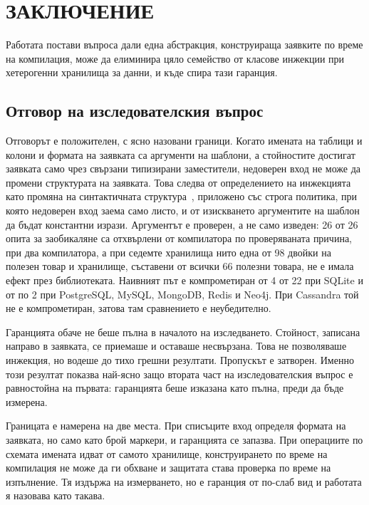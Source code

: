 \section*{ЗАКЛЮЧЕНИЕ}
\label{sec:conclusion}

Работата постави въпроса дали една абстракция, конструираща заявките по време на
компилация, може да елиминира цяло семейство от класове инжекции при хетерогенни
хранилища за данни, и къде спира тази гаранция.

\subsection*{Отговор на изследователския въпрос}

Отговорът е положителен, с ясно назовани граници. Когато имената на таблици и
колони и формата на заявката са аргументи на шаблони, а стойностите достигат
заявката само чрез свързани типизирани заместители, недоверен вход не може да
промени структурата на заявката. Това следва от определението на инжекцията като
промяна на синтактичната структура~\cite{su2006essence}, приложено със строга
политика, при която недоверен вход заема само листо, и от изискването
аргументите на шаблон да бъдат константни изрази. Аргументът е проверен, а не
само изведен: 26 от 26 опита за заобикаляне са отхвърлени от компилатора по
проверяваната причина, при два компилатора, а при седемте хранилища нито една от
98 двойки на полезен товар и хранилище, съставени от всички 66 полезни товара,
не е имала ефект през библиотеката. Наивният път е компрометиран от 4 от 22 при
SQLite и от по 2 при PostgreSQL, MySQL, MongoDB, Redis и Neo4j. При Cassandra той не
е компрометиран, затова там сравнението е неубедително.

Гаранцията обаче не беше пълна в началото на изследването. Стойност, записана
направо в заявката, се приемаше и оставаше несвързана. Това не позволяваше
инжекция, но водеше до тихо грешни резултати. Пропускът е затворен. Именно този
резултат показва най-ясно защо втората част на изследователския въпрос е
равностойна на първата: гаранцията беше изказана като пълна, преди да бъде
измерена.

Границата е намерена на две места. При списъците вход определя формата на заявката,
но само като брой маркери, и гаранцията се запазва. При операциите по схемата имената
идват от самото хранилище, конструирането по време на компилация не може да ги
обхване и защитата става проверка по време на изпълнение. Тя издържа на измерването,
но е гаранция от по-слаб вид и работата я назовава като такава.

